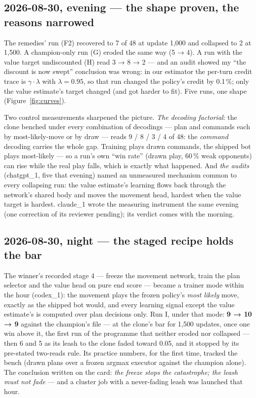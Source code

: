 \documentclass[11pt,a4paper]{article}
\begin{document}
\subsection*{2026-08-30, evening --- the shape proven, the reasons narrowed}
The remedies' run (F2) recovered to 7 of 48 at update 1,000 and collapsed to 2 at 1,500. A champion-only run (G) eroded the same way (5 → 4). A run with the value target undiscounted (H) read 3 → 8 → 2 --- and an audit showed my ``the discount is now swept'' conclusion was wrong: in our estimator the per-turn credit trace is $\gamma \cdot \lambda$ with $\lambda = 0.95$, so that run changed the policy's credit by 0.1\,\%; only the value estimate's target changed (and got harder to fit). Five runs, one shape (Figure~\ref{fig:curves}).

Two control measurements sharpened the picture. \emph{The decoding factorial}: the clone benched under every combination of decodings --- plan and commands each by most-likely-move or by draw --- reads 9 / 8 / 3 / 4 of 48: the \emph{command} decoding carries the whole gap. Training plays drawn commands, the shipped bot plays most-likely --- so a run's own ``win rate'' (drawn play, 60\,\% weak opponents) can rise while the real play falls, which is exactly what happened. And \emph{the audits} (chatgpt\_1, five that evening) named an unmeasured mechanism common to every collapsing run: the value estimate's learning flows back through the network's shared body and moves the movement head, hardest when the value target is hardest. claude\_1 wrote the measuring instrument the same evening (one correction of its reviewer pending); its verdict comes with the morning.

\subsection*{2026-08-30, night --- the staged recipe holds the bar}
The winner's recorded stage 4 --- freeze the movement network, train the plan selector and the value head on pure end score --- became a trainer mode within the hour (codex\_1): the movement plays the frozen policy's \emph{most likely} move, exactly as the shipped bot would, and every learning signal except the value estimate's is computed over plan decisions only. Run I, under that mode: \textbf{9 → 10 → 9} against the champion's file --- at the clone's bar for 1,500 updates, once one win above it, the first run of the programme that neither eroded nor collapsed --- then 6 and 5 as its leash to the clone faded toward 0.05, and it stopped by its pre-stated two-reads rule. Its practice numbers, for the first time, tracked the bench (drawn plans over a frozen argmax executor against the champion alone). The conclusion written on the card: \emph{the freeze stops the catastrophe; the leash must not fade} --- and a cluster job with a never-fading leash was launched that hour.
\end{document}
